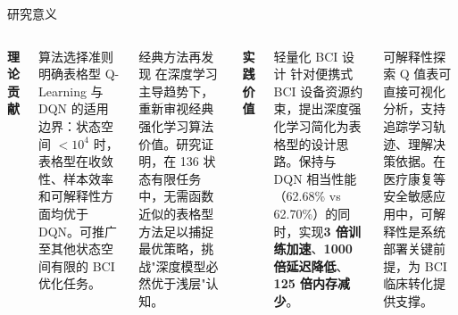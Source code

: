 \begin{frame}{研究意义}
    \begin{columns}[T]
        \textbf{理论贡献}
        
        \vspace{0.15cm}
        \begin{block}{算法选择准则}
            \scriptsize
            明确表格型 Q-Learning 与 DQN 的适用边界：状态空间 $< 10^4$ 时，表格型在收敛性、样本效率和可解释性方面均优于 DQN。可推广至其他状态空间有限的 BCI 优化任务。
        \end{block}
        
        \vspace{0.2cm}
        \begin{block}{经典方法再发现}
            \scriptsize
            在深度学习主导趋势下，重新审视经典强化学习算法价值。研究证明，在 136 状态有限任务中，无需函数近似的表格型方法足以捕捉最优策略，挑战"深度模型必然优于浅层"认知。
        \end{block}

        \textbf{实践价值}
        
        \vspace{0.15cm}
        \begin{block}{轻量化 BCI 设计}
            \scriptsize
            针对便携式 BCI 设备资源约束，提出深度强化学习简化为表格型的设计思路。保持与 DQN 相当性能（62.68\% vs 62.70\%）的同时，实现\textbf{3 倍训练加速}、\textbf{1000 倍延迟降低}、\textbf{125 倍内存减少}。
        \end{block}
        
        \vspace{0.2cm}
        \begin{block}{可解释性探索}
            \scriptsize
            Q 值表可直接可视化分析，支持追踪学习轨迹、理解决策依据。在医疗康复等安全敏感应用中，可解释性是系统部署关键前提，为 BCI 临床转化提供支撑。
        \end{block}
    \end{columns}
\end{frame}
